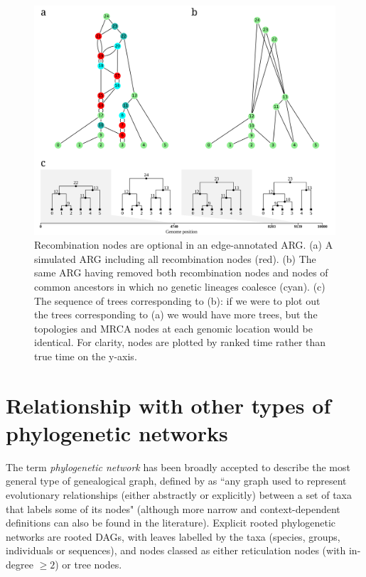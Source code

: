 \documentclass{article}
\begin{document}
\begin{figure}
\centering
\vspace{5em}
\includegraphics[width=\linewidth]{illustrations/ARG_recomb_node_deletion}
\caption{\label{fig-recombination-nodes}
Recombination nodes are optional in an edge-annotated ARG. (a) A simulated
ARG including all recombination nodes (red). (b) The same ARG having removed both
recombination nodes and nodes of common ancestors in which no genetic
lineages coalesce (cyan). (c) The sequence of trees corresponding to (b): if we were
to plot out the trees corresponding to (a) we would have more trees, but the topologies
and MRCA nodes at each genomic location would be identical. For clarity, nodes are
plotted by ranked time rather than true time on the y-axis.
}
\end{figure}

\section*{Relationship with other types of phylogenetic networks}

The term \emph{phylogenetic network} has been broadly accepted to describe the most general
type of genealogical graph, defined by \citet{huson2010phylogenetic} as ``any graph used to
represent evolutionary relationships (either abstractly or explicitly) between a set of taxa
that labels some of its nodes" (although more narrow and context-dependent definitions can also
be found in the literature). Explicit rooted phylogenetic networks are rooted DAGs,
with leaves labelled by the taxa (species, groups, individuals or sequences), and nodes classed
as either reticulation nodes (with in-degree $\geq 2$) or tree nodes.
\end{document}
